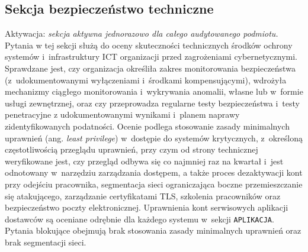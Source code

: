 \subsection{Sekcja bezpieczeństwo techniczne}
\noindent Aktywacja: \textit{sekcja aktywna jednorazowo dla całego audytowanego podmiotu.}\\
Pytania w tej sekcji służą do oceny skuteczności technicznych środków ochrony systemów i~infrastruktury ICT organizacji przed zagrożeniami cybernetycznymi. Sprawdzane jest, czy organizacja określiła zakres monitorowania bezpieczeństwa (z~udokumentowanymi wyłączeniami i~środkami kompensującymi), wdrożyła mechanizmy ciągłego monitorowania i~wykrywania anomalii, własne lub w~formie usługi zewnętrznej, oraz czy przeprowadza regularne testy bezpieczeństwa i~testy penetracyjne z udokumentowanymi wynikami i~planem naprawy zidentyfikowanych podatności. Ocenie podlega stosowanie zasady minimalnych uprawnień (ang. \textit{least privilege}) w~dostępie do systemów krytycznych, z~określoną częstotliwością przeglądu uprawnień, przy czym od strony technicznej weryfikowane jest, czy przegląd odbywa się co najmniej raz na kwartał i~jest odnotowany w~narzędziu zarządzania dostępem, a także proces dezaktywacji kont przy odejściu pracownika, segmentacja sieci ograniczająca boczne przemieszczanie się atakującego, zarządzanie certyfikatami TLS, szkolenia pracowników oraz bezpieczeństwo poczty elektronicznej. Uprawnienia kont serwisowych aplikacji dostawców są oceniane odrębnie dla każdego systemu w~sekcji \texttt{APLIKACJA}. Pytania blokujące obejmują brak stosowania zasady minimalnych uprawnień oraz brak segmentacji sieci.

